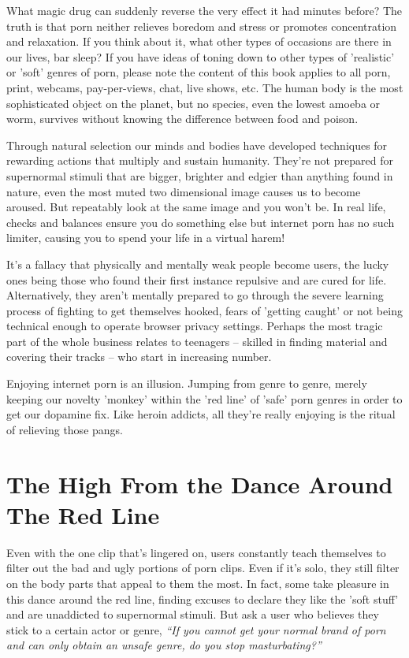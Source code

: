\documentclass[
]{book}
\begin{document}
What magic drug can suddenly reverse the very effect it had minutes before? The truth is that porn neither relieves boredom and stress or promotes concentration and relaxation. If you think about it, what other types of occasions are there in our lives, bar sleep? If you have ideas of toning down to other types of 'realistic' or 'soft' genres of porn, please note the content of this book applies to all porn, print, webcams, pay-per-views, chat, live shows, etc. The human body is the most sophisticated object on the planet, but no species, even the lowest amoeba or worm, survives without knowing the difference between food and poison.

Through natural selection our minds and bodies have developed techniques for rewarding actions that multiply and sustain humanity. They're not prepared for supernormal stimuli that are bigger, brighter and edgier than anything found in nature, even the most muted two dimensional image causes us to become aroused. But repeatably look at the same image and you won't be. In real life, checks and balances ensure you do something else but internet porn has no such limiter, causing you to spend your life in a virtual harem!

It's a fallacy that physically and mentally weak people become users, the lucky ones being those who found their first instance repulsive and are cured for life. Alternatively, they aren't mentally prepared to go through the severe learning process of fighting to get themselves hooked, fears of 'getting caught' or not being technical enough to operate browser privacy settings. Perhaps the most tragic part of the whole business relates to teenagers -- skilled in finding material and covering their tracks -- who start in increasing number.

Enjoying internet porn is an illusion. Jumping from genre to genre, merely keeping our novelty 'monkey' within the 'red line' of 'safe' porn genres in order to get our dopamine fix. Like heroin addicts, all they're really enjoying is the ritual of relieving those pangs.

\hypertarget{the-high-from-the-dance-around-the-red-line}{%
\section{The High From the Dance Around The Red Line}\label{the-high-from-the-dance-around-the-red-line}}

Even with the one clip that's lingered on, users constantly teach themselves to filter out the bad and ugly portions of porn clips. Even if it's solo, they still filter on the body parts that appeal to them the most. In fact, some take pleasure in this dance around the red line, finding excuses to declare they like the 'soft stuff' and are unaddicted to supernormal stimuli. But ask a user who believes they stick to a certain actor or genre, \emph{``If you cannot get your normal brand of porn and can only obtain an unsafe genre, do you stop masturbating?''}
\end{document}
